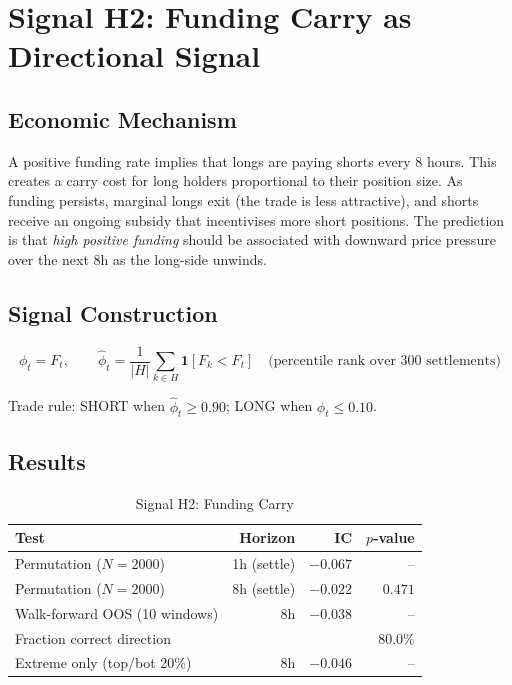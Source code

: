 \documentclass[12pt, a4paper]{article}
\theoremstyle{definition}
\begin{document}
\section{Signal H2: Funding Carry as Directional Signal}

\subsection{Economic Mechanism}

A positive funding rate implies that longs are paying shorts every 8 hours.
This creates a carry cost for long holders proportional to their position
size. As funding persists, marginal longs exit (the trade is less attractive),
and shorts receive an ongoing subsidy that incentivises more short positions.
The prediction is that \emph{high positive funding} should be associated with
downward price pressure over the next 8h as the long-side unwinds.

\subsection{Signal Construction}

\[
  \phi_t = F_t, \qquad
  \hat\phi_t = \frac{1}{|H|}\sum_{k \in H} \mathbf{1}[F_k < F_t]
  \quad \text{(percentile rank over 300 settlements)}
\]

Trade rule: SHORT when $\hat\phi_t \geq 0.90$; LONG when $\hat\phi_t \leq 0.10$.

\subsection{Results}

\begin{table}[H]
\centering
\caption{Signal H2: Funding Carry}
\begin{tabular}{lrrr}
\toprule
Test & Horizon & IC & $p$-value \\
\midrule
Permutation ($N=2000$) & 1h (settle) & $-0.067$ & -- \\
Permutation ($N=2000$) & 8h (settle) & $-0.022$ & $0.471$ \\
Walk-forward OOS (10 windows) & 8h & $-0.038$ & -- \\
\quad Fraction correct direction & & & $80.0\%$ \\
\midrule
Extreme only (top/bot 20\%) & 8h & $-0.046$ & -- \\
\bottomrule
\end{tabular}
\end{table}
\end{document}
